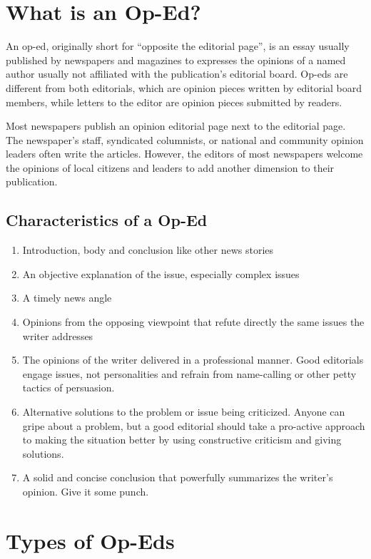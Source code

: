 \section{What is an Op-Ed?}

An op-ed, originally short for ``opposite the editorial page'', is an essay usually published by newspapers and magazines to expresses the opinions of a named author usually not affiliated with the publication's editorial board. Op-eds are different from both editorials, which are opinion pieces written by editorial board members, while letters to the editor are opinion pieces submitted by readers.

Most newspapers publish an opinion editorial page next to the editorial page. The newspaper's staff, syndicated columnists, or national and community opinion leaders often write the articles. However, the editors of most newspapers welcome the opinions of local citizens and leaders to add another dimension to their publication.

\subsection{Characteristics of a Op-Ed}

\begin{enumerate}
	\item Introduction, body and conclusion like other news stories
	\item An objective explanation of the issue, especially complex issues
	\item A timely news angle
	\item Opinions from the opposing viewpoint that refute directly the same issues the writer addresses
	\item The opinions of the writer delivered in a professional manner. Good editorials engage issues, not personalities and refrain from name-calling or other petty tactics of persuasion.
	\item Alternative solutions to the problem or issue being criticized. Anyone can gripe about a problem, but a good editorial should take a pro-active approach to making the situation better by using constructive criticism and giving solutions.
	\item A solid and concise conclusion that powerfully summarizes the writer's opinion. Give it some punch.
\end{enumerate}


\section{Types of Op-Eds}

